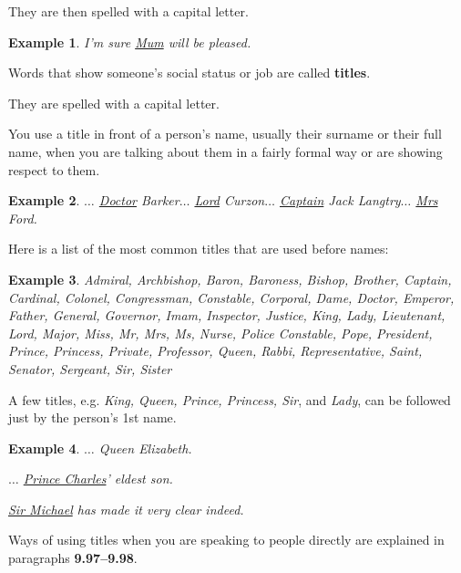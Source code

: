 \documentclass[oneside]{book}
\numberwithin{equation}{section}
\newtheorem{example}{Example}[section]
\begin{document}
They are then spelled with a capital letter.
\begin{example}
    I'm sure \underline{Mum} will be pleased.
\end{example}
%
\noindent{} Words that show someone's social status or job are called \textbf{titles}.

They are spelled with a capital letter.

%
You use a title in front of a person's name, usually their surname or their full name, when you are talking about them in a fairly formal way or are showing respect to them.
\begin{example}
    $\ldots$ \underline{Doctor} Barker$\ldots$ \underline{Lord} Curzon$\ldots$ \underline{Captain} Jack Langtry$\ldots$ \underline{Mrs} Ford.
\end{example}
Here is a list of the most common titles that are used before names:
\begin{example}
    Admiral, Archbishop, Baron, Baroness, Bishop, Brother, Captain, Cardinal, Colonel, Congressman, Constable, Corporal, Dame, Doctor, Emperor, Father, General, Governor, Imam, Inspector, Justice, King, Lady, Lieutenant, Lord, Major, Miss, Mr, Mrs, Ms, Nurse, Police Constable, Pope, President, Prince, Princess, Private, Professor, Queen, Rabbi, Representative, Saint, Senator, Sergeant, Sir, Sister
\end{example}
A few titles, e.g. \textit{King, Queen, Prince, Princess, Sir}, and \textit{Lady}, can be followed just by the person's 1st name.
\begin{example}
    $\ldots$ Queen Elizabeth.
    
    $\ldots$ \underline{Prince Charles}' eldest son.
    
    \underline{Sir Michael} has made it very clear indeed.
\end{example}
Ways of using titles when you are speaking to people directly are explained in paragraphs \textbf{9.97--9.98}.
\end{document}
